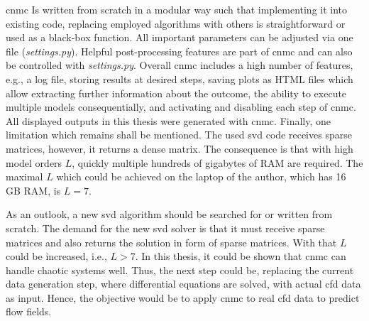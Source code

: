 \gls{cnmc} Is written from scratch in a modular way such that implementing it into existing code, replacing employed algorithms with others is straightforward or used as a black-box function.
All important parameters can be adjusted via one file (\emph{settings.py}).
Helpful post-processing features are part of \gls{cnmc} and can also be controlled with \emph{settings.py}.
Overall \gls{cnmc} includes a high number of features, e.g., a log file, storing results at desired steps, saving plots as HTML files which allow extracting further information about the outcome, the ability to execute multiple models consequentially, and activating and disabling each step of \gls{cnmc}.
All displayed outputs in this thesis were generated with \gls{cnmc}. 
Finally, one limitation which remains shall be mentioned.
The used \gls{svd} code receives sparse matrices, however, it returns a dense matrix. The consequence is that with high model orders $L$, quickly multiple hundreds of gigabytes of RAM are required. 
The maximal $L$ which could be achieved on the laptop of the author, which has 16 GB RAM, is $L=7$.\newline

As an outlook, a new \gls{svd} algorithm should be searched for or written from scratch. 
The demand for the new \gls{svd} solver is that it must receive sparse matrices and also returns the solution in form of sparse matrices. 
With that $L$ could be increased, i.e., $L>7$. 
In this thesis, it could be shown that \gls{cnmc} can handle chaotic systems well. Thus, the next step could be, replacing the current data generation step, where differential equations are solved, with actual \gls{cfd} data as input.
Hence, the objective would be to apply \gls{cnmc} to real \gls{cfd} data to predict flow fields.